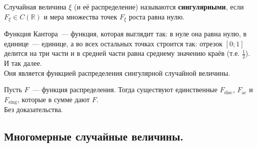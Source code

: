 \documentclass{article}
\begin{document}
    \begin{definition}
        Случайная величина $\xi$ (и её распределение) называются \textbf{сингулярными}, если $F_\xi\in C(\mathbb R)$ и мера множества точек $F_\xi$ роста равна нулю.
    \end{definition}
    \begin{example}
        Функция Кантора~--- функция, которая выглядит так: в нуле она равна нулю, в единице~--- единице, а во всех остальных точках строится так: отрезок $[0;1]$ делится на три части и в средней части равна среднему значению краёв (т.е. $\frac12$). И так далее.\\
        Оня является функцией распределения сингулярной случайной величины.
    \end{example}
    \begin{theorem}
        Пусть $F$~--- функция распределения. Тогда существуют единственные $F_{\mathrm{disc}}$, $F_{\mathrm{ac}}$ и $F_{\mathrm{sing}}$, которые в сумме дают $F$.\\
        Без доказательства.
    \end{theorem}
    \subsection{Многомерные случайные величины.}
\end{document}
